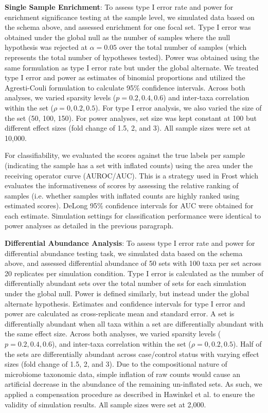 \documentclass[10pt,letterpaper]{article}
\begin{document}
\noindent \textbf{Single Sample Enrichment}: To assess type I error rate and power for enrichment significance testing at the sample level, we simulated data based on the schema above, and assessed enrichment for one focal set. Type I error was obtained under the global null as the number of samples where the null hypothesis was rejected at $\alpha = 0.05$ over the total number of samples (which represents the total number of hypotheses tested). Power was obtained using the same formulation as type I error rate but under the global alternate. We treated type I error and power as estimates of binomial proportions and utilized the Agresti-Couli \cite{agresti1998} formulation to calculate 95\% confidence intervals. Across both analyses, we varied sparsity levels ($p = 0.2, 0.4, 0.6$) and inter-taxa correlation within the set ($\rho = 0, 0.2, 0.5$). For type I error analysis, we also varied the size of the set (50, 100, 150). For power analyses, set size was kept constant at 100 but different effect sizes (fold change of 1.5, 2, and 3). All sample sizes were set at 10,000. 

For classifiability, we evaluated the scores against the true labels per sample (indicating the sample has a set with inflated counts) using the area under the receiving operator curve (AUROC/AUC). This is a strategy used in Frost \cite{frost2020a} which evaluates the informativeness of scores by assessing the relative ranking of samples (i.e. whether samples with inflated counts are highly ranked using estimated scores).  DeLong 95\% confidence intervals for AUC \cite{delong1988} were obtained for each estimate. Simulation settings for classification performance were identical to power analyses as detailed in the previous paragraph. 

\noindent \textbf{Differential Abundance Analysis}: To assess type I error rate and power for differential abundance testing task, we simulated data based on the schema above, and assessed differential abundance of 50 sets with 100 taxa per set across 20 replicates per simulation condition. Type I error is calculated as the number of differentially abundant sets over the total number of sets for each simulation under the global null. Power is defined similarly, but instead under the global alternate hypothesis. Estimates and confidence intervals for type I error and power are calculated as cross-replicate mean and standard error. A set is differentially abundant when all taxa within a set are differentially abundant with the same effect size. Across both analyses, we varied sparsity levels ($p = 0.2, 0.4, 0.6$), and inter-taxa correlation within the set ($\rho = 0, 0.2, 0.5$). Half of the sets are differentially abundant across case/control status with varying effect sizes (fold change of 1.5, 2, and 3). Due to the compositional nature of microbiome taxonomic data, simple inflation of raw counts would cause an artificial decrease in the abundance of the remaining un-inflated sets. As such, we applied a compensation procedure as described in Hawinkel et al. \cite{hawinkel2019} to ensure the validity of simulation results. All sample sizes were set at 2,000.    
\end{document}
